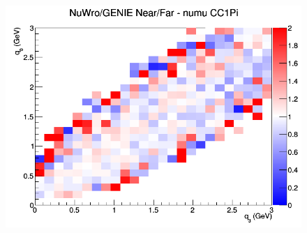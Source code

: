 \documentclass[12pt]{article}
\begin{document}
\begin{figure}[h]
\endminipage
{}
\includegraphics[width=\linewidth]{eff_q0_q3/GAr/ratios/CC1Pi_NuWro_GENIE_numu_NF_q3_q0.png}
\endminipage
\newline
\end{figure}
\clearpage
\end{document}
